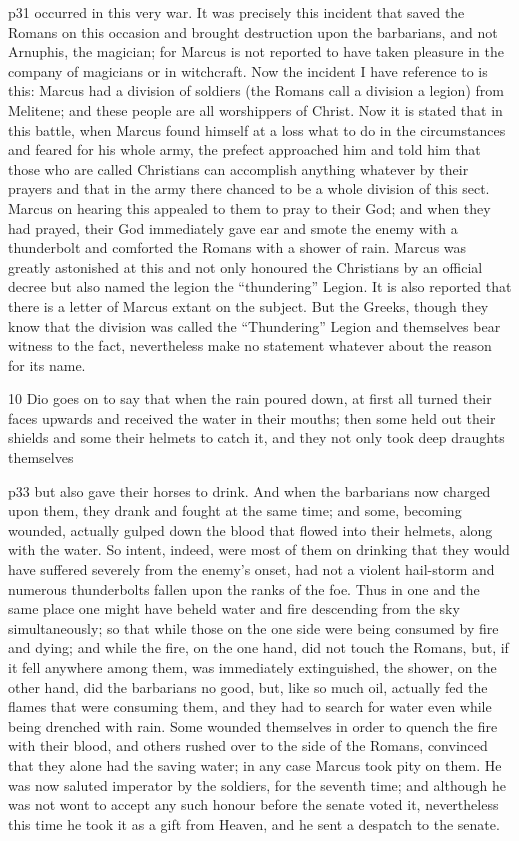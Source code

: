p31 occurred in this very war. It was precisely this incident that saved the Romans on this occasion and brought destruction upon the barbarians, and not Arnuphis, the magician; for Marcus is not reported to have taken pleasure in the company of magicians or in witchcraft. Now the incident I have reference to is this: Marcus had a division of soldiers (the Romans call a division a legion) from Melitene; and these people are all worshippers of Christ. Now it is stated that in this battle, when Marcus found himself at a loss what to do in the circumstances and feared for his whole army, the prefect approached him and told him that those who are called Christians can accomplish anything whatever by their prayers and that in the army there chanced to be a whole division of this sect. Marcus on hearing this appealed to them to pray to their God; and when they had prayed, their God immediately gave ear and smote the enemy with a thunderbolt and comforted the Romans with a shower of rain. Marcus was greatly astonished at this and not only honoured the Christians by an official decree but also named the legion the ``thundering'' Legion. It is also reported that there is a letter of Marcus extant on the subject. But the Greeks, though they know that the division was called the ``Thundering'' Legion and themselves bear witness to the fact, nevertheless make no statement whatever about the reason for its name.

10
Dio goes on to say that when the rain poured down, at first all turned their faces upwards and received the water in their mouths; then some held out their shields and some their helmets to catch it, and they not only took deep draughts themselves

p33 but also gave their horses to drink. And when the barbarians now charged upon them, they drank and fought at the same time; and some, becoming wounded, actually gulped down the blood that flowed into their helmets, along with the water. So intent, indeed, were most of them on drinking that they would have suffered severely from the enemy's onset, had not a violent hail-storm and numerous thunderbolts fallen upon the ranks of the foe. Thus in one and the same place one might have beheld water and fire descending from the sky simultaneously; so that while those on the one side were being consumed by fire and dying; and while the fire, on the one hand, did not touch the Romans, but, if it fell anywhere among them, was immediately extinguished, the shower, on the other hand, did the barbarians no good, but, like so much oil, actually fed the flames that were consuming them, and they had to search for water even while being drenched with rain. Some wounded themselves in order to quench the fire with their blood, and others rushed over to the side of the Romans, convinced that they alone had the saving water; in any case Marcus took pity on them. He was now saluted imperator by the soldiers, for the seventh time; and although he was not wont to accept any such honour before the senate voted it, nevertheless this time he took it as a gift from Heaven, and he sent a despatch to the senate.

